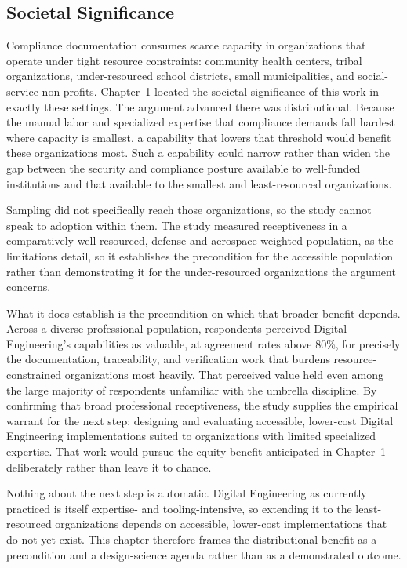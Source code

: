 \subsection{Societal Significance}

Compliance documentation consumes scarce capacity in organizations that operate under tight resource constraints: community health centers, tribal organizations, under-resourced school districts, small municipalities, and social-service non-profits. Chapter~1 located the societal significance of this work in exactly these settings. The argument advanced there was distributional. Because the manual labor and specialized expertise that compliance demands fall hardest where capacity is smallest, a capability that lowers that threshold would benefit these organizations most. Such a capability could narrow rather than widen the gap between the security and compliance posture available to well-funded institutions and that available to the smallest and least-resourced organizations.

Sampling did not specifically reach those organizations, so the study cannot speak to adoption within them. The study measured receptiveness in a comparatively well-resourced, defense-and-aerospace-weighted population, as the limitations detail, so it establishes the precondition for the accessible population rather than demonstrating it for the under-resourced organizations the argument concerns.

What it does establish is the precondition on which that broader benefit depends. Across a diverse professional population, respondents perceived Digital Engineering's capabilities as valuable, at agreement rates above 80\%, for precisely the documentation, traceability, and verification work that burdens resource-constrained organizations most heavily. That perceived value held even among the large majority of respondents unfamiliar with the umbrella discipline. By confirming that broad professional receptiveness, the study supplies the empirical warrant for the next step: designing and evaluating accessible, lower-cost Digital Engineering implementations suited to organizations with limited specialized expertise. That work would pursue the equity benefit anticipated in Chapter~1 deliberately rather than leave it to chance.

Nothing about the next step is automatic. Digital Engineering as currently practiced is itself expertise- and tooling-intensive, so extending it to the least-resourced organizations depends on accessible, lower-cost implementations that do not yet exist. This chapter therefore frames the distributional benefit as a precondition and a design-science agenda rather than as a demonstrated outcome.

